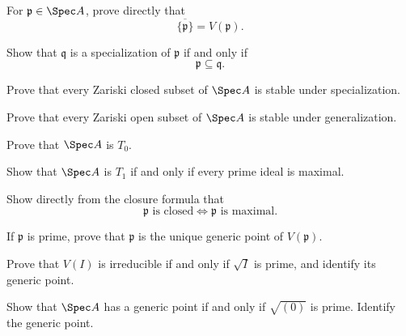 \begin{exercise}
For $\mathfrak p\in\Spec A$, prove directly that
\[
\overline{\{\mathfrak p\}}=V(\mathfrak p).
\]
\end{exercise}

\begin{exercise}
Show that $\mathfrak q$ is a specialization of $\mathfrak p$ if and only if
\[
\mathfrak p\subseteq\mathfrak q.
\]
\end{exercise}

\begin{exercise}
Prove that every Zariski closed subset of $\Spec A$ is stable under specialization.
\end{exercise}

\begin{exercise}
Prove that every Zariski open subset of $\Spec A$ is stable under generalization.
\end{exercise}

\begin{exercise}
Prove that $\Spec A$ is $T_0$.
\end{exercise}

\begin{exercise}
Show that $\Spec A$ is $T_1$ if and only if every prime ideal is maximal.
\end{exercise}

\begin{exercise}
Show directly from the closure formula that
\[
\mathfrak p\text{ is closed}\Longleftrightarrow\mathfrak p\text{ is maximal}.
\]
\end{exercise}

\begin{exercise}
If $\mathfrak p$ is prime, prove that $\mathfrak p$ is the unique generic point of
$V(\mathfrak p)$.
\end{exercise}

\begin{exercise}[VI.09.E9 - Irreducible $V(I)$]
Prove that $V(I)$ is irreducible if and only if $\sqrt I$ is prime, and identify its
generic point.
\end{exercise}

\begin{exercise}
Show that $\Spec A$ has a generic point if and only if $\sqrt{(0)}$ is prime.  Identify
the generic point.
\end{exercise}

